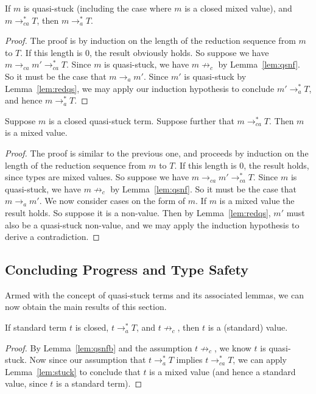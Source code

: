 \documentclass{LMCS}
\begin{document}
\begin{lem}
\label{lem:cac}
If $m$ is quasi-stuck (including the case where $m$ is a
closed mixed value), and $m\to_{ca}^* T$, then $m \to_a^* T$.
\end{lem}
\begin{proof}  The proof is by induction on the length of
the reduction sequence from $m$ to $T$.  If this length is $0$, the
result obviously holds.  So suppose we have $m \to_{ca} m' \to_{ca}^*
T$.  Since $m$ is quasi-stuck, we have $m\not\to_c$ by
Lemma~\ref{lem:qsnf}.  So it must be the case that $m\to_a m'$.  Since
$m'$ is quasi-stuck by Lemma~\ref{lem:redqs}, we may apply our
induction hypothesis to conclude $m'\to_a^* T$, and hence $m\to_a^*
T$.
\end{proof}

\begin{lem}
\label{lem:stuck}
Suppose $m$ is a closed quasi-stuck term.  Suppose further that $m \to_{ca}^* T$.
Then $m$ is a mixed value.
\end{lem}
\begin{proof} The proof is similar to the previous one,
and proceeds by induction on the length of the reduction sequence from
$m$ to $T$.  If this length is $0$, the result holds, since types are
mixed values.  So suppose we have $m \to_{ca} m' \to_{ca}^* T$.  Since
$m$ is quasi-stuck, we have $m\not\to_c$ by Lemma~\ref{lem:qsnf}.  So
it must be the case that $m\to_a m'$.  We now consider cases on the
form of $m$.  If $m$ is a mixed value the result holds.  So suppose it
is a non-value.  Then by Lemma~\ref{lem:redqs}, $m'$ must also be a
quasi-stuck non-value, and we may apply the induction hypothesis to
derive a contradiction. \end{proof}

\subsection{Concluding Progress and Type Safety}

Armed with the concept of quasi-stuck terms and its associated lemmas,
we can now obtain the main results of this section.

\begin{thm}[Progress]
\label{thm:progstlc}
If standard term $t$ is closed, $t\to_a^* T$, and $t\not\to_c$, then
$t$ is a (standard) value.
\end{thm}

\begin{proof} By Lemma~\ref{lem:qsnfb} and the assumption $t\not\to_c$, we know $t$ is quasi-stuck.
Now since our assumption that $t\to_a^* T$ implies $t \to_{ca}^* T$,
we can apply Lemma~\ref{lem:stuck} to conclude that $t$ is a mixed
value (and hence a standard value, since $t$ is a standard term).  
\end{proof}
\end{document}
